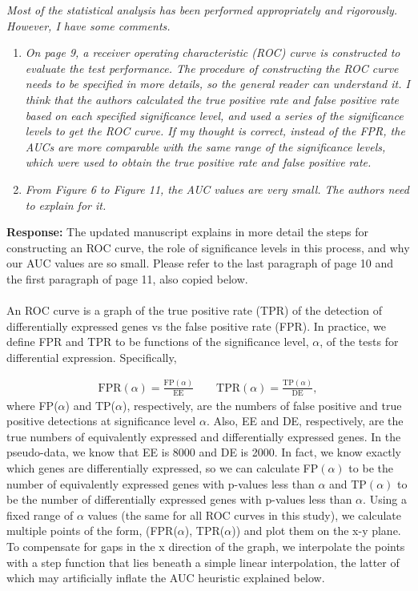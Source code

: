 \documentclass{article}
\begin{document}
\begin{flushleft}
\emph{Most of the statistical analysis has been performed appropriately and rigorously. However, I have some comments.}
\begin{enumerate}
\item \emph{On page 9, a receiver operating characteristic (ROC) curve is constructed to evaluate the test performance. The procedure of constructing the ROC curve needs to be specified in more details, so the general reader can understand it. I think that the authors calculated the true positive rate and false positive rate based on each specified significance level, and used a series of the significance levels to get the ROC curve. If my thought is correct, instead of the FPR, the AUCs are more comparable with the same range of the significance levels, which were used to obtain the true positive rate and false positive rate.}
\item \emph{From Figure 6 to Figure 11, the AUC values are very small. The authors need to explain for it.}
\end{enumerate}

{\bf Response:} The updated manuscript explains in more detail the steps for constructing an ROC curve, the role of significance levels in this process, and why our AUC values are so small. Please refer to the last paragraph of page 10 and the first paragraph of page 11, also copied below.


{\color{blue}\paragraph{} \indent  
An ROC curve is a graph of the true positive rate (TPR) of the detection of differentially expressed genes vs the false positive rate (FPR). In practice, we define FPR and TPR to be functions of the significance level, $\alpha$, of the tests for differential expression. Specifically,
   
\begin{align*}
\text{FPR}(\alpha) = \frac{\text{FP}(\alpha)}{\text{EE}} \qquad \text{TPR}(\alpha) = \frac{\text{TP}(\alpha)}{\text{DE}},
\end{align*}
where FP($\alpha$) and TP($\alpha$), respectively, are the numbers of false positive and true positive detections at significance level $\alpha$. Also, EE and DE, respectively, are the true numbers of equivalently expressed and differentially expressed genes. In the pseudo-data, we know that EE is 8000 and DE is 2000. In fact, we know exactly which genes are differentially expressed, so we can calculate FP$(\alpha)$ to be the number of equivalently expressed genes with p-values less than $\alpha$ and TP$(\alpha)$ to be the number of differentially expressed genes with p-values less than $\alpha$. Using a fixed range of $\alpha$ values (the same for all ROC curves in this study), we calculate multiple points of the form, (FPR($\alpha$), TPR($\alpha$)) and plot them on the x-y plane. To compensate for gaps in the x direction of the graph, we interpolate the points with a step function that lies beneath a simple linear interpolation, the latter of which may artificially inflate the AUC heuristic explained below.

}
\end{flushleft}
\end{document}
